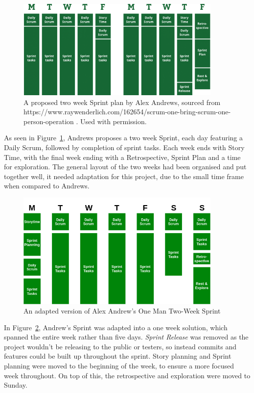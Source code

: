 \documentclass[a4paper,10pt]{report}
\begin{document}
\begin{figure}[h!]
    \centering
  \includegraphics[width=0.9\textwidth]{RayWenderlich}
 \caption [A proposed two week Sprint plan by Alex Andrews]{A proposed two week Sprint plan by Alex Andrews, sourced from https://www.raywenderlich.com/162654/scrum-one-bring-scrum-one-person-operation . Used with permission.}
 \label{fig:two_week_sprint_plan}
\end{figure}

As seen in Figure~\ref{fig:two_week_sprint_plan}, Andrews proposes a two week Sprint, each day featuring a Daily Scrum, followed by completion of sprint tasks. Each week ends with Story Time, with the final week ending with a Retrospective, Sprint Plan and a time for exploration. The general layout of the two weeks had been organised and put together well, it needed adaptation for this project, due to the small time frame when compared to Andrews. \medskip

\begin{figure}[h!]
    \centering
  \includegraphics[width=0.9\textwidth]{Sprint_Plan}
 \caption{An adapted version of Alex Andrew's One Man Two-Week Sprint}
 \label{fig:one_week_sprint_plan}
\end{figure}

In Figure~\ref{fig:one_week_sprint_plan}, Andrew's Sprint was adapted into a one week solution, which spanned the entire week rather than five days. \textit{Sprint Release} was removed as the project wouldn't be releasing to the public or testers, so instead commits and features could be built up throughout the sprint. Story planning and Sprint planning were moved to the beginning of the week, to ensure a more focused week throughout. On top of this, the retrospective and exploration were moved to Sunday. \medskip
\end{document}
